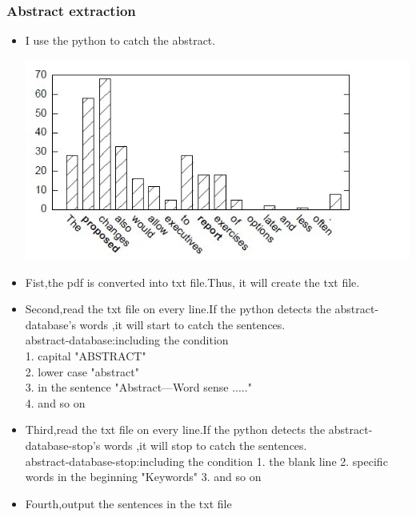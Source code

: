 \subsubsection*{Abstract extraction}
\begin{itemize}
	\item I use the python to catch the abstract.
	\begin{center}
		\includegraphics[width=0.8\columnwidth]{Union_Background_Chart_2}
	\end{center}
	\item Fist,the pdf is converted into txt file.Thus, it will create the txt file.\\ 
	\item Second,read the txt file on every line.If the python detects the abstract-database's words ,it will start to catch the sentences.\\ 	
	abstract-database:including the condition\\
	1. capital         "ABSTRACT"\\
	2. lower case      "abstract"\\
	3. in the sentence "Abstract—Word sense ....."\\
	4. and so on \\
	\item Third,read the txt file on every line.If the python detects the abstract-database-stop's words ,it will stop to catch the sentences.\\ 
	abstract-database-stop:including the condition
	1. the blank line
	2. specific words in the beginning "Keywords"
	3. and so on
	\item Fourth,output the sentences in the txt file\\ 	
	
\end{itemize}

